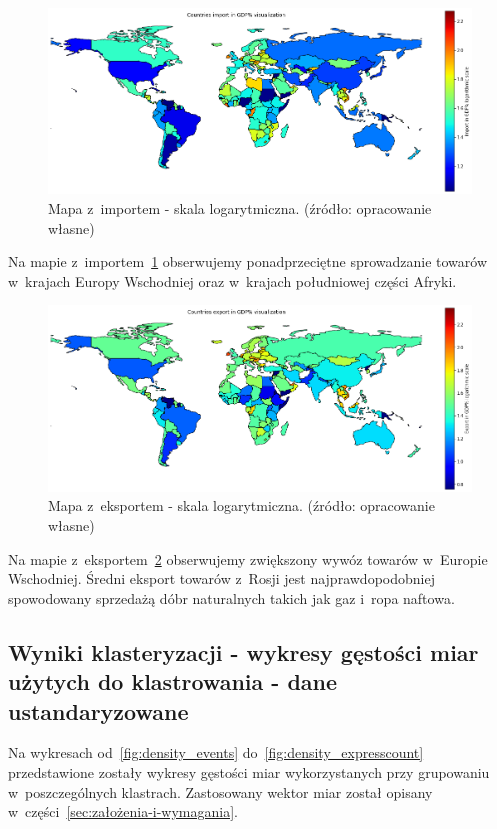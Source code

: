 \documentclass[11pt]{report}
\begin{document}
    \begin{figure}[!htp]
        \centering
        \includegraphics[width=\linewidth]{fig/CLUST/import2015.png}
        \caption{Mapa z~importem - skala logarytmiczna. (źródło: opracowanie własne)}
        \label{fig:clustImport2015_log}
    \end{figure}
    Na mapie z~importem~\ref{fig:clustImport2015_log} obserwujemy ponadprzeciętne sprowadzanie towarów w~krajach Europy Wschodniej oraz w~krajach południowej części Afryki.

    \begin{figure}[!htp]
        \centering
        \includegraphics[width=\linewidth]{fig/CLUST/export2015.png}
        \caption{Mapa z~eksportem - skala logarytmiczna. (źródło: opracowanie własne)}
        \label{fig:clustExport2015_log}
    \end{figure}
    Na mapie z~eksportem~\ref{fig:clustExport2015_log} obserwujemy zwiększony wywóz towarów w~Europie Wschodniej.
    Średni eksport towarów z~Rosji jest najprawdopodobniej spowodowany sprzedażą dóbr naturalnych takich jak gaz i~ropa naftowa.

    \subsection{Wyniki klasteryzacji - wykresy gęstości miar użytych do klastrowania - dane ustandaryzowane}\label{subsec:wyniki-klasteryzacji---wykresy-gęstości-miar-użytych-do-klastrowania---dane-ustandaryzowane}
    Na wykresach od~\ref{fig:density_events} do~\ref{fig:density_expresscount} przedstawione zostały wykresy gęstości miar wykorzystanych przy grupowaniu w~poszczególnych klastrach.
    Zastosowany wektor miar został opisany w~części~\ref{sec:założenia-i-wymagania}.
\end{document}
